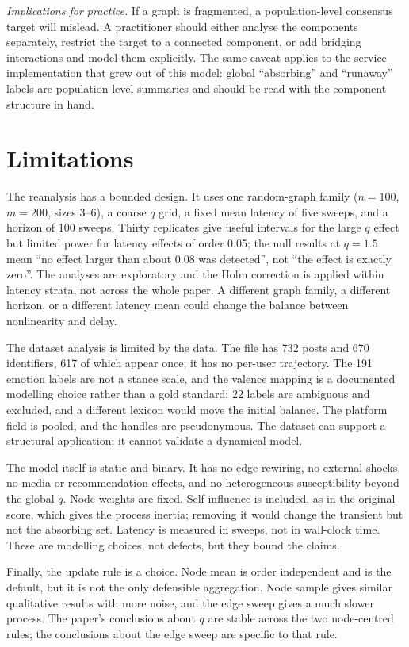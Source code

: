 \documentclass[conference]{IEEEtran}
\begin{document}
\emph{Implications for practice.} If a graph is fragmented, a population-level consensus target will mislead. A practitioner should either analyse the components separately, restrict the target to a connected component, or add bridging interactions and model them explicitly. The same caveat applies to the service implementation that grew out of this model: global ``absorbing'' and ``runaway'' labels are population-level summaries and should be read with the component structure in hand.

\section{Limitations}

The reanalysis has a bounded design. It uses one random-graph family ($n=100$, $m=200$, sizes 3--6), a coarse $q$ grid, a fixed mean latency of five sweeps, and a horizon of 100 sweeps. Thirty replicates give useful intervals for the large $q$ effect but limited power for latency effects of order 0.05; the null results at $q=1.5$ mean ``no effect larger than about 0.08 was detected'', not ``the effect is exactly zero''. The analyses are exploratory and the Holm correction is applied within latency strata, not across the whole paper. A different graph family, a different horizon, or a different latency mean could change the balance between nonlinearity and delay.

The dataset analysis is limited by the data. The file has 732 posts and 670 identifiers, 617 of which appear once; it has no per-user trajectory. The 191 emotion labels are not a stance scale, and the valence mapping is a documented modelling choice rather than a gold standard: 22 labels are ambiguous and excluded, and a different lexicon would move the initial balance. The platform field is pooled, and the handles are pseudonymous. The dataset can support a structural application; it cannot validate a dynamical model.

The model itself is static and binary. It has no edge rewiring, no external shocks, no media or recommendation effects, and no heterogeneous susceptibility beyond the global $q$. Node weights are fixed. Self-influence is included, as in the original score, which gives the process inertia; removing it would change the transient but not the absorbing set. Latency is measured in sweeps, not in wall-clock time. These are modelling choices, not defects, but they bound the claims.

Finally, the update rule is a choice. Node mean is order independent and is the default, but it is not the only defensible aggregation. Node sample gives similar qualitative results with more noise, and the edge sweep gives a much slower process. The paper's conclusions about $q$ are stable across the two node-centred rules; the conclusions about the edge sweep are specific to that rule.
\end{document}
